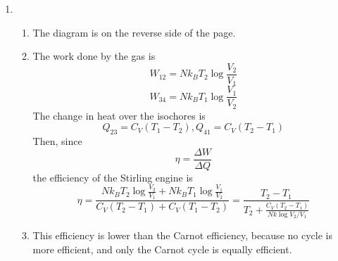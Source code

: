 \documentclass[fleqn]{article}[12pt]
\begin{document}
\begin{enumerate}
    \item \begin{enumerate}
        \item The diagram is on the reverse side of the page.
        \item The work done by the gas is
        \begin{equation*}
            W_{12} = Nk_BT_2\log \frac{V_2}{V_1}
        \end{equation*}
        \begin{equation*}
            W_{34} = Nk_BT_1\log \frac{V_1}{V_2}
        \end{equation*}
        The change in heat over the isochores is
        \begin{equation*}
            Q_{23} = C_{V} (T_1-T_2), Q_{41} = C_{V} (T_2-T_1)
        \end{equation*}
        Then, since
        \begin{equation*}
            \eta = \frac{\Delta W}{\Delta Q}
        \end{equation*}
        the efficiency of the Stirling engine is
        \begin{equation*}
            \eta = \frac{Nk_BT_2\log \frac{V_2}{V_1} + Nk_BT_1\log \frac{V_1}{V_2}}{C_{V} (T_2-T_1) + C_{V} (T_1-T_2)}
            = \frac{T_2-T_1}{T_2 + \frac{C_V (T_2-T_1)}{Nk\log V_2/V_1}}
        \end{equation*}
        \item This efficiency is lower than the Carnot efficiency, because no cycle is more efficient, and only the Carnot cycle is equally efficient.

    \end{enumerate}

\end{enumerate}
\end{document}
